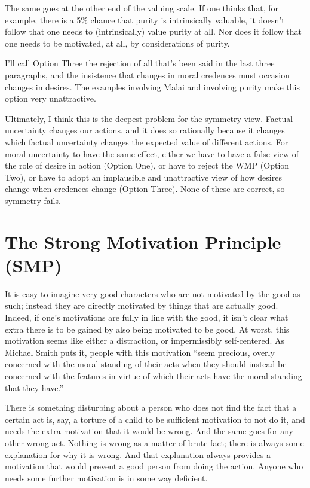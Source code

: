 The same goes at the other end of the valuing scale. If one thinks that, for example, there is a 5\% chance that purity is intrinsically valuable, it doesn't follow that one needs to (intrinsically) value purity at all. Nor does it follow that one needs to be motivated, at all, by considerations of purity.

I'll call Option Three the rejection of all that's been said in the last three paragraphs, and the insistence that changes in moral credences must occasion changes in desires. The examples involving \gls{Malai} and involving purity make this option very unattractive.

Ultimately, I think this is the deepest problem for the symmetry view. Factual uncertainty changes our actions, and it does so rationally because it changes which factual uncertainty changes the expected value of different actions. For moral uncertainty to have the same effect, either we have to have a false view of the role of desire in action (Option One), or have to reject the WMP (Option Two), or have to adopt an implausible and unattractive view of how desires change when credences change (Option Three). None of these are correct, so symmetry fails.

\section{The Strong Motivation Principle (SMP)}
\label{thestrongmotivationprinciplesmp}

It is easy to imagine very good characters who are not motivated by the good as such; instead they are directly motivated by things that are actually good. Indeed, if one's motivations are fully in line with the good, it isn't clear what extra there is to be gained by also being motivated to be good. At worst, this motivation seems like either a distraction, or impermissibly self-centered. As Michael Smith puts it, people with this motivation ``seem precious, overly concerned with the moral standing of their acts when they should instead be concerned with the features in virtue of which their acts have the moral standing that they have.'' ~\citep[183]{Smith1996}

There is something disturbing about a person who does not find the fact that a certain act is, say, a torture of a child to be sufficient motivation to not do it, and needs the extra motivation that it would be wrong. And the same goes for any other wrong act. Nothing is wrong as a matter of brute fact; there is always some explanation for why it is wrong. And that explanation always provides a motivation that would prevent a good person from doing the action. Anyone who needs some further motivation is in some way deficient.

